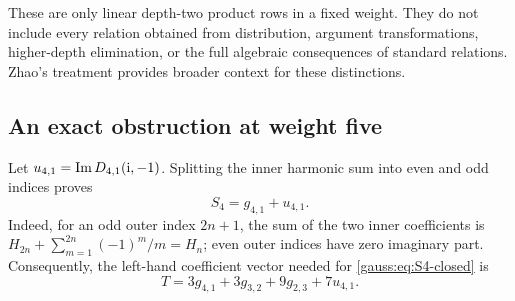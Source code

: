 These are only linear depth-two product rows in a fixed weight. They do not include every relation obtained from distribution, argument transformations, higher-depth elimination, or the full algebraic consequences of standard relations. Zhao's treatment \cite{gaussian:Zhao} provides broader context for these distinctions.

\subsection{An exact obstruction at weight five}
Let $u_{4,1}=\operatorname{Im} D_{4,1}(\mathrm{i},-1)$. Splitting the inner harmonic sum into even and odd indices proves
\begin{equation}\label{signed:eq:S4-color}
 S_4=g_{4,1}+u_{4,1}.
\end{equation}
Indeed, for an odd outer index $2n+1$, the sum of the two inner coefficients is
$H_{2n}+\sum_{m=1}^{2n}(-1)^m/m=H_n$; even outer indices have zero imaginary part.
Consequently, the left-hand coefficient vector needed for \eqref{gauss:eq:S4-closed} is
\begin{equation}\label{signed:eq:S4-target}
 T=3g_{4,1}+3g_{3,2}+9g_{2,3}+7u_{4,1}.
\end{equation}

